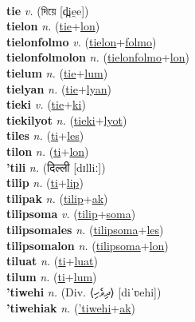  \label{ti} \\
\textbf{tie} \textit{v.} ({\bengali{}দিয়ে} [d̪ie̯e])
 \label{tie} \\
\textbf{tielon} \textit{n.} (\hyperref[tie]{tie}+\hyperref[lon]{lon})
 \label{tielon} \\
\textbf{tielonfolmo} \textit{v.} (\hyperref[tielon]{tielon}+\hyperref[folmo]{folmo})
 \label{tielonfolmo} \\
\textbf{tielonfolmolon} \textit{n.} (\hyperref[tielonfolmo]{tielonfolmo}+\hyperref[lon]{lon})
 \label{tielonfolmolon} \\
\textbf{tielum} \textit{n.} (\hyperref[tie]{tie}+\hyperref[lum]{lum})
 \label{tielum} \\
\textbf{tielyan} \textit{n.} (\hyperref[tie]{tie}+\hyperref[lyan]{lyan})
 \label{tielyan} \\
\textbf{tieki} \textit{v.} (\hyperref[tie]{tie}+\hyperref[ki]{ki})
 \label{tieki} \\
\textbf{tiekilyot} \textit{n.} (\hyperref[tieki]{tieki}+\hyperref[lyot]{lyot})
 \label{tiekilyot} \\
\textbf{tiles} \textit{n.} (\hyperref[ti]{ti}+\hyperref[les]{les})
 \label{tiles} \\
\textbf{tilon} \textit{n.} (\hyperref[ti]{ti}+\hyperref[lon]{lon})
 \label{tilon} \\
\textbf{'tili} \textit{n.} ({\devanagari{}दिल्ली } [dɪlliː])
 \label{'tili} \\
\textbf{tilip} \textit{n.} (\hyperref[ti]{ti}+\hyperref[lip]{lip})
 \label{tilip} \\
\textbf{tilipak} \textit{n.} (\hyperref[tilip]{tilip}+\hyperref[ak]{ak})
 \label{tilipak} \\
\textbf{tilipsoma} \textit{v.} (\hyperref[tilip]{tilip}+\hyperref[soma]{soma})
 \label{tilipsoma} \\
\textbf{tilipsomales} \textit{n.} (\hyperref[tilipsoma]{tilipsoma}+\hyperref[les]{les})
 \label{tilipsomales} \\
\textbf{tilipsomalon} \textit{n.} (\hyperref[tilipsoma]{tilipsoma}+\hyperref[lon]{lon})
 \label{tilipsomalon} \\
\textbf{tiluat} \textit{n.} (\hyperref[ti]{ti}+\hyperref[luat]{luat})
 \label{tiluat} \\
\textbf{tilum} \textit{n.} (\hyperref[ti]{ti}+\hyperref[lum]{lum})
 \label{tilum} \\
\textbf{'tiwehi} \textit{n.} (Div. ⟨ދިވެހި⟩ [diˈʋehi])
 \label{'tiwehi} \\
\textbf{'tiwehiak} \textit{n.} (\hyperref['tiwehi]{'tiwehi}+\hyperref[ak]{ak})
